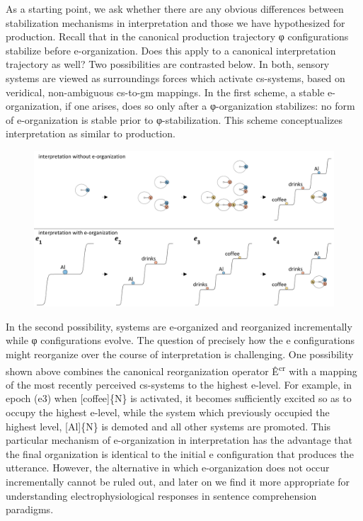   As a starting point, we ask whether there are any obvious differences between stabilization mechanisms in interpretation and those we have hypothesized for production. Recall that in the canonical production trajectory φ configurations stabilize before e-organization. Does this apply to a canonical interpretation trajectory as well? Two possibilities are contrasted below. In both, sensory systems are viewed as surroundings forces which activate cs-systems, based on veridical, non-ambiguous cs-to-gm mappings. In the first scheme, a stable e-organization, if one arises, does so only after a φ-organization stabilizes: no form of e-organization is stable prior to φ-stabilization. This scheme conceptualizes interpretation as similar to production.

  
\begin{figure}
\includegraphics[width=\textwidth]{figures/Tilsen-img90.png}
\caption{\missingcaption}
\label{fig:}
\end{figure}
 

  In the second possibility, systems are e-organized and reorganized incrementally while φ configurations evolve. The question of precisely how the e configurations might reorganize over the course of interpretation is challenging. One possibility shown above combines the canonical reorganization operator Ê\textsuperscript{cr} with a mapping of the most recently perceived cs-systems to the highest e-level. For example, in epoch (e3) when [coffee]\{N\} is activated, it becomes sufficiently excited so as to occupy the highest e-level, while the system which previously occupied the highest level, [Al]\{N\} is demoted and all other systems are promoted. This particular mechanism of e-organization in interpretation has the advantage that the final organization is identical to the initial e configuration that produces the utterance. However, the alternative in which e-organization does not occur incrementally cannot be ruled out, and later on we find it more appropriate for understanding electrophysiological responses in sentence comprehension paradigms.

